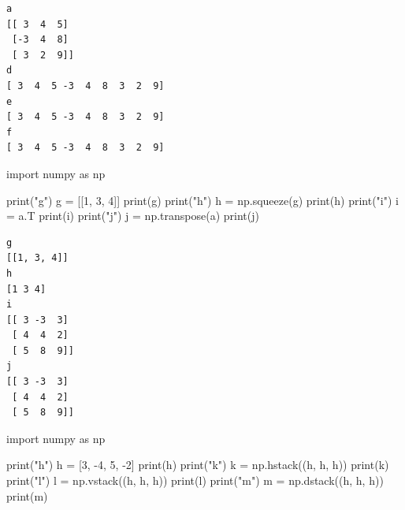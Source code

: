 \documentclass[
  letterpaper,
  DIV=11,
  numbers=noendperiod]{scrreprt}
\newenvironment{Shaded}{\begin{snugshade}}{\end{snugshade}}
\newcommand{\BuiltInTok}[1]{\textcolor[rgb]{0.00,0.23,0.31}{#1}}
\newcommand{\DecValTok}[1]{\textcolor[rgb]{0.68,0.00,0.00}{#1}}
\newcommand{\ImportTok}[1]{\textcolor[rgb]{0.00,0.46,0.62}{#1}}
\newcommand{\NormalTok}[1]{\textcolor[rgb]{0.00,0.23,0.31}{#1}}
\newcommand{\OperatorTok}[1]{\textcolor[rgb]{0.37,0.37,0.37}{#1}}
\newcommand{\StringTok}[1]{\textcolor[rgb]{0.13,0.47,0.30}{#1}}
\begin{document}
\begin{verbatim}
a
[[ 3  4  5]
 [-3  4  8]
 [ 3  2  9]]
d
[ 3  4  5 -3  4  8  3  2  9]
e
[ 3  4  5 -3  4  8  3  2  9]
f
[ 3  4  5 -3  4  8  3  2  9]
\end{verbatim}

\begin{Shaded}
\begin{Highlighting}[]
\ImportTok{import}\NormalTok{ numpy }\ImportTok{as}\NormalTok{ np}

\BuiltInTok{print}\NormalTok{(}\StringTok{"g"}\NormalTok{)}
\NormalTok{g }\OperatorTok{=}\NormalTok{ [[}\DecValTok{1}\NormalTok{, }\DecValTok{3}\NormalTok{, }\DecValTok{4}\NormalTok{]]}
\BuiltInTok{print}\NormalTok{(g)}
\BuiltInTok{print}\NormalTok{(}\StringTok{"h"}\NormalTok{)}
\NormalTok{h }\OperatorTok{=}\NormalTok{ np.squeeze(g)}
\BuiltInTok{print}\NormalTok{(h)}
\BuiltInTok{print}\NormalTok{(}\StringTok{"i"}\NormalTok{)}
\NormalTok{i }\OperatorTok{=}\NormalTok{ a.T}
\BuiltInTok{print}\NormalTok{(i)}
\BuiltInTok{print}\NormalTok{(}\StringTok{"j"}\NormalTok{)}
\NormalTok{j }\OperatorTok{=}\NormalTok{ np.transpose(a)}
\BuiltInTok{print}\NormalTok{(j)}
\end{Highlighting}
\end{Shaded}

\begin{verbatim}
g
[[1, 3, 4]]
h
[1 3 4]
i
[[ 3 -3  3]
 [ 4  4  2]
 [ 5  8  9]]
j
[[ 3 -3  3]
 [ 4  4  2]
 [ 5  8  9]]
\end{verbatim}

\begin{Shaded}
\begin{Highlighting}[]
\ImportTok{import}\NormalTok{ numpy }\ImportTok{as}\NormalTok{ np}

\BuiltInTok{print}\NormalTok{(}\StringTok{"h"}\NormalTok{)}
\NormalTok{h }\OperatorTok{=}\NormalTok{ [}\DecValTok{3}\NormalTok{, }\OperatorTok{{-}}\DecValTok{4}\NormalTok{, }\DecValTok{5}\NormalTok{, }\OperatorTok{{-}}\DecValTok{2}\NormalTok{]}
\BuiltInTok{print}\NormalTok{(h)}
\BuiltInTok{print}\NormalTok{(}\StringTok{"k"}\NormalTok{)}
\NormalTok{k }\OperatorTok{=}\NormalTok{ np.hstack((h, h, h))}
\BuiltInTok{print}\NormalTok{(k)}
\BuiltInTok{print}\NormalTok{(}\StringTok{"l"}\NormalTok{)}
\NormalTok{l }\OperatorTok{=}\NormalTok{ np.vstack((h, h, h))}
\BuiltInTok{print}\NormalTok{(l)}
\BuiltInTok{print}\NormalTok{(}\StringTok{"m"}\NormalTok{)}
\NormalTok{m }\OperatorTok{=}\NormalTok{ np.dstack((h, h, h))}
\BuiltInTok{print}\NormalTok{(m)}
\end{Highlighting}
\end{Shaded}
\end{document}
